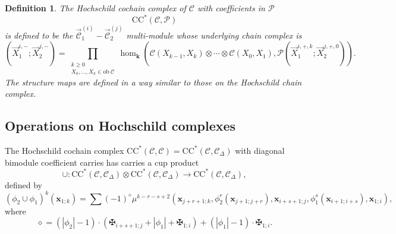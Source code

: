 \documentclass[11pt]{amsproc}
\def\K{{\mathbf{k}}}
\def\cP{\mathcal{P}}
\def\cc{\mathcal{C}}
\def\r#1{\mathrm{#1}}
\def\D{\Delta}
\def\ob{\mathrm{ob\ }}
\newtheorem{defn}[lem]{Definition}
\theoremstyle{remark}
\numberwithin{equation}{section}
\begin{document}
\begin{defn}
The Hochschild cochain complex of $\cc$ with coefficients in $\cP$ 
\begin{equation}
\r{CC}^{*}(\cc, \cP)
\end{equation}
is defined to be the $\overrightarrow{\cc}_{1}^{(i)} - \overrightarrow{\cc}_{2}^{(j)}$ multi-module whose underlying chain complex is
\begin{equation}
(\vec{X}_{1}^{i, -}; \vec{X}_{2}^{j, -}) = \prod_{\substack{k \ge 0\\X_{0}, \ldots, X_{k} \in \ob \cc}} \hom_{\K}(\cc(X_{k-1}, X_{k}) \otimes \cdots \otimes \cc(X_{0}, X_{1}), \cP(\vec{X}_{1}^{i, +, k}; \vec{X}_{2}^{j, +, 0})).
\end{equation}
The structure maps are defined in a way similar to those on the Hochschild chain complex.
\end{defn}

\subsection{Operations on Hochschild complexes}\label{section: products on Hochschild}

The Hochschild cochain complex $\r{CC}^{*}(\cc, \cc) = \r{CC}^{*}(\cc, \cc_{\D})$ with diagonal bimodule coefficient carries has carries a cup product
\begin{equation}\label{cup product cc}
\cup: \r{CC}^{*}(\cc, \cc_{\D}) \otimes \r{CC}^{*}(\cc, \cc_{\D}) \to \r{CC}^{*}(\cc, \cc_{\D}),
\end{equation}
defined by
\begin{equation}
(\phi_{2} \cup \phi_{1})^{k}(\mathbf{x}_{1;k}) = \sum (-1)^{\diamond} \mu^{k-r-s+2}(\mathbf{x}_{j+r+1; k}, \phi_{2}^{r}(\mathbf{x}_{j+1; j+r}), \mathbf{x}_{i+s+1; j}, \phi_{1}^{s}(\mathbf{x}_{i+1; i+s}), \mathbf{x}_{1;i}),
\end{equation}
where
\begin{equation}
\diamond = (|\phi_{2}|-1) \cdot (\maltese_{i+s+1;j} + |\phi_{1}| + \maltese_{1;i}) + (|\phi_{1}|-1) \cdot \maltese_{1;i}.
\end{equation}
\end{document}
